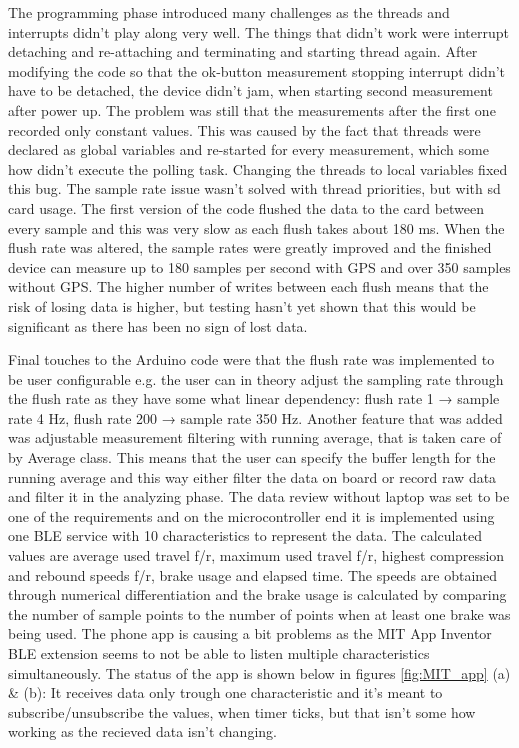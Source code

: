 \documentclass[a4paper,11pt]{article} %
\begin{document}
The programming phase introduced many challenges as the threads and interrupts didn't play along very well. The things that didn't work were interrupt detaching and re-attaching and terminating and starting thread again. After modifying the code so that the ok-button measurement stopping interrupt didn't have to be detached, the device didn't jam, when starting second measurement after power up. The problem was still that the measurements after the first one recorded only constant values. This was caused by the fact that threads were declared as global variables and re-started for every measurement, which some how didn't execute the polling task. Changing the threads to local variables fixed this bug. The sample rate issue wasn't solved with thread priorities, but with sd card usage. The first version of the code flushed the data to the card between every sample and this was very slow as each flush takes about 180 ms. When the flush rate was altered, the sample rates were greatly improved and the finished device can measure up to 180 samples per second with GPS and over 350 samples without GPS. The higher number of writes between each flush means that the risk of losing data is higher, but testing hasn't yet shown that this would be significant as there has been no sign of lost data.

Final touches to the Arduino code were that the flush rate was implemented to be user configurable e.g. the user can in theory adjust the sampling rate through the flush rate as they have some what linear dependency: flush rate 1 → sample rate 4 Hz, flush rate 200 → sample rate 350 Hz. Another feature that was added was adjustable measurement filtering with running average, that is taken care of by Average class. This means that the user can specify the buffer length for the running average and this way either filter the data on board or record raw data and filter it in the analyzing phase. The data review without laptop was set to be one of the requirements and on the microcontroller end it is implemented using one BLE service with 10 characteristics to represent the data. The calculated values are average used travel f/r, maximum used travel f/r, highest compression and rebound speeds f/r, brake usage and elapsed time. The speeds are obtained through numerical differentiation and the brake usage is calculated by comparing the number of sample points to the number of points when at least one brake was being used. The phone app is causing a bit problems as the MIT App Inventor BLE extension seems to not be able to listen multiple characteristics simultaneously. The status of the app is shown below in figures \ref{fig:MIT_app} (a) \& (b): It receives data only trough one characteristic and it's meant to subscribe/unsubscribe the values, when timer ticks, but that isn't some how working as the recieved data isn't changing.
\end{document}
